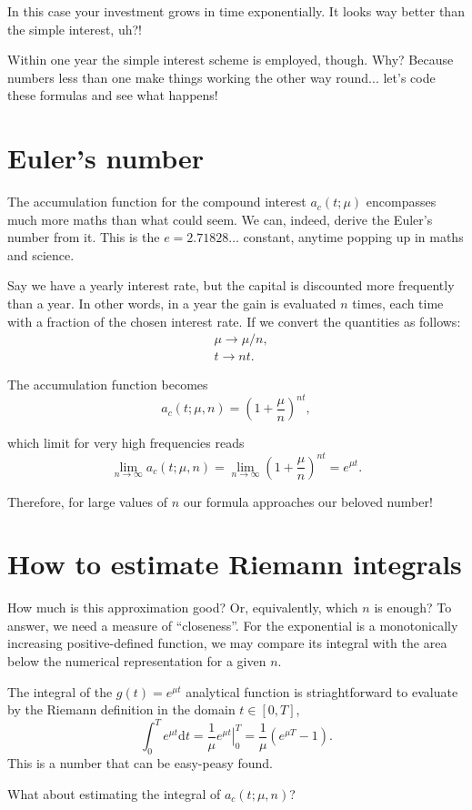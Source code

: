 \documentclass{article}
\begin{document}
In this case your investment grows in time exponentially. It looks way better than the simple interest, uh?!

Within one year the simple interest scheme is employed, though. Why? Because numbers less than one make things working the other way round... let's code these formulas and see what happens!

\section{Euler's number}
The accumulation function for the compound interest $a_c(t; \mu)$ encompasses much more maths than what could seem. We can, indeed, derive the Euler's number from it. This is the $e=2.71828\ldots$ constant, anytime popping up in maths and science.

Say we have a yearly interest rate, but the capital is discounted more frequently than a year. In other words, in a year the gain is evaluated $n$ times, each time with a fraction of the chosen interest rate. If we convert the quantities as follows:
\begin{align}
&\mu \rightarrow \mu/n,\\
&t \rightarrow nt.
\end{align}

The accumulation function becomes
\begin{equation}
a_c(t; \mu, n) = \left( 1 + \frac{\mu}{n}\right)^{nt},
\end{equation}

which limit for very high frequencies reads
\begin{equation}
\lim_{n\rightarrow \infty} a_c(t; \mu, n) = \lim_{n\rightarrow \infty} \left( 1 + \frac{\mu}{n}\right)^{nt} = e^{\mu t}.
\end{equation}

Therefore, for large values of $n$ our formula approaches our beloved number!

\section{How to estimate Riemann integrals}
How much is this approximation good? Or, equivalently, which $n$ is enough? To answer, we need a measure of ``closeness''. For the exponential is a monotonically increasing positive-defined function, we may compare its integral with the area below the numerical representation for a given $n$.

The integral of the $g(t) = e^{\mu t}$ analytical function is striaghtforward to evaluate by the Riemann definition in the domain $t \in [0, T]$,
\begin{equation}
\int_0^T e^{\mu t} \mathrm{d}t = \frac{1}{\mu} \left. e^{\mu t}\right|_0^T = \frac{1}{\mu} \left( e^{\mu T} - 1\right).
\end{equation}
This is a number that can be easy-peasy found.

What about estimating the integral of $a_c(t; \mu, n)$?
\end{document}
